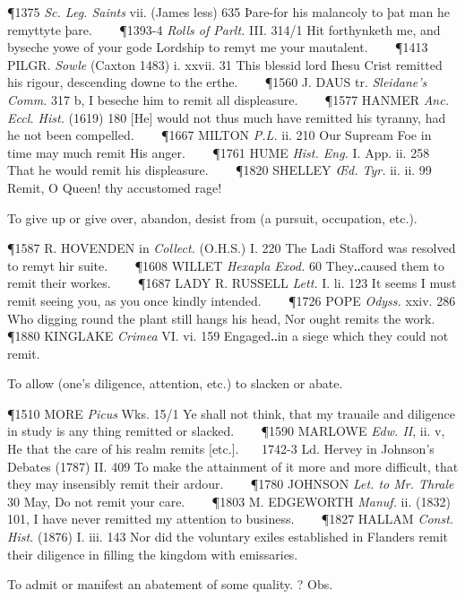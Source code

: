 \begin{description}[wide, labelwidth=!, labelindent=0pt]
\begin{myenumerate}
\P 1375  \textit{Sc. Leg. Saints} vii. (James less) 635 Þare-for his malancoly to þat man he remyttyte þare.    
\P 1393-4 \textit{Rolls of Parlt.} III. 314/1 Hit forthynketh me, and byseche yowe of your gode Lordship to remyt me your mautalent.    
\P 1413 PILGR.  \textit{Sowle} (Caxton 1483) i. xxvii. 31 This blessid lord Ihesu Crist remitted his rigour, descending downe to the erthe.    
\P 1560 J. DAUS tr. \textit{Sleidane's Comm.} 317 b, I beseche him to remit all displeasure.    
\P 1577 HANMER  \textit{Anc. Eccl. Hist.} (1619) 180 [He] would not thus much have remitted his tyranny, had he not been compelled.    
\P 1667 MILTON  \textit{P.L.} ii. 210 Our Supream Foe in time may much remit His anger.    
\P 1761 HUME  \textit{Hist. Eng.} I. App. ii. 258 That he would remit his displeasure.    
\P 1820 SHELLEY  \textit{Œd. Tyr.} ii. ii. 99 Remit, O Queen! thy accustomed rage!

 To give up or give over, abandon, desist from (a pursuit, occupation, etc.).

\P 1587 R. HOVENDEN in  \textit{Collect.} (O.H.S.) I. 220 The Ladi Stafford was resolved to remyt hir suite.    
\P 1608 WILLET  \textit{Hexapla Exod.} 60 They‥caused them to remit their workes.    
\P 1687 LADY R. RUSSELL \textit{Lett.} I. li. 123 It seems I must remit seeing you, as you once kindly intended.    
\P 1726 POPE  \textit{Odyss.} xxiv. 286 Who digging round the plant still hangs his head, Nor ought remits the work.    
\P 1880 KINGLAKE  \textit{Crimea} VI. vi. 159 Engaged‥in a siege which they could not remit.

 To allow (one's diligence, attention, etc.) to slacken or abate.

\P 1510 MORE  \textit{Picus} Wks. 15/1 Ye shall not think, that my trauaile and diligence in study is any thing remitted or slacked.    
\P 1590 MARLOWE  \textit{Edw. II}, ii. v, He that the care of his realm remits [etc.].    1742-3 Ld. Hervey in Johnson's Debates (1787) II. 409 To make the attainment of it more and more difficult, that they may insensibly remit their ardour.    
\P 1780 JOHNSON  \textit{Let. to Mr. Thrale} 30 May, Do not remit your care.    
\P 1803 M. EDGEWORTH  \textit{Manuf.} ii. (1832) 101, I have never remitted my attention to business.    
\P 1827 HALLAM  \textit{Const. Hist.} (1876) I. iii. 143 Nor did the voluntary exiles established in Flanders remit their diligence in filling the kingdom with emissaries.

 To admit or manifest an abatement of some quality. ? Obs.


\end{myenumerate}
\end{description}
